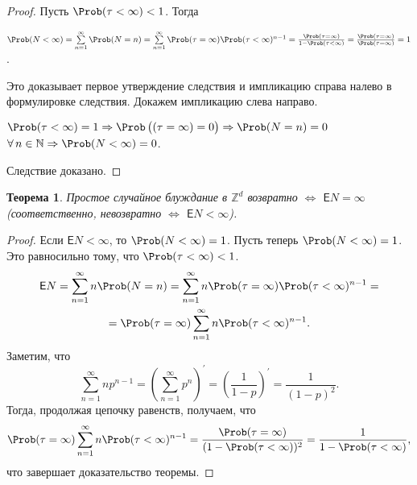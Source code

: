 \documentclass[a4paper]{article}
\newcommand{\Expect}{\mathsf{E}}
\theoremstyle{plain}
\newtheorem{thm}{Теорема}[section]
\theoremstyle{definition}
\theoremstyle{remark}
\begin{document}
\begin{proof}
  Пусть $\Prob(\tau < \infty) < 1$. Тогда
  \begin{flushleft}
    $\Prob(N < \infty) = \sum\limits_{n=1}^{\infty} \Prob(N = n) = \sum\limits_{n=1}^{\infty} \Prob(\tau = \infty) \Prob(\tau < \infty)^{n-1} = \frac{\Prob(\tau = \infty)}{1 - \Prob(\tau < \infty)} = \frac{\Prob(\tau = \infty)}{\Prob(\tau = \infty)} = 1$.
  \end{flushleft}
  Это доказывает первое утверждение следствия и импликацию справа налево в формулировке следствия. Докажем импликацию слева направо.
  \begin{flushleft}
    $\Prob(\tau < \infty) = 1 \Rightarrow \Prob \left((\tau = \infty ) = 0 \right) \Rightarrow \Prob(N = n) = 0$ $\forall\, n \in \mathbb{N} \Rightarrow \Prob(N < \infty) = 0$.
  \end{flushleft}
  Следствие доказано.
\end{proof}

\begin{thm}
  Простое случайное блуждание в $\mathbb{Z}^{d}$ возвратно $\Leftrightarrow$ $\Expect N = \infty$ (соответственно, невозвратно $\Leftrightarrow$ $\Expect N < \infty$).
\end{thm}

\begin{proof}
  Если $\Expect N < \infty$, то $\Prob(N<\infty) = 1$.
  Пусть теперь $\Prob(N<\infty) = 1$. Это равносильно тому, что $\Prob(\tau < \infty) < 1$.
  \begin{multline*}
    \Expect N = \sum_{n=1}^{\infty} n\Prob(N=n) = \sum\limits_{n=1}^{\infty} n\Prob(\tau = \infty)\Prob(\tau < \infty)^{n-1} = \\ =\Prob(\tau = \infty)\sum\limits_{n=1}^{\infty} n\Prob(\tau < \infty)^{n-1}.
  \end{multline*}
  Заметим, что
  \begin{equation*}
    \sum_{n=1}^{\infty} np^{n-1} = (\sum\limits_{n=1}^{\infty} p^{n})^{\prime} = (\frac{1}{1-p})^{\prime} = \frac{1}{(1-p)^{2}}.
  \end{equation*}
  Тогда, продолжая цепочку равенств, получаем, что
  \begin{equation*}
    \Prob(\tau = \infty)\sum_{n=1}^{\infty} n\Prob(\tau < \infty)^{n-1} = \frac{\Prob(\tau = \infty)}{(1 - \Prob(\tau < \infty))^{2}} = \frac{1}{1 - \Prob(\tau < \infty)},
  \end{equation*}
  что завершает доказательство теоремы.
\end{proof}
\end{document}
